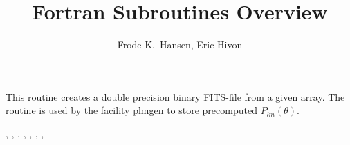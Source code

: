 
\sloppy


\title{\healpix Fortran Subroutines Overview}
 \section[write\_plm]{ }
\label{sub:write_plm}
\author{Frode K.~Hansen, Eric Hivon}

\begin{facility}
{This routine creates a double precision binary FITS-file from a given array. The routine is used by the \healpix facility plmgen to store precomputed $P_{lm}(\theta)$.}
{\modFitstools}
\end{facility}

\begin{f90format}
{%
, %
, %
, %
, %
, %
, %
, %
}
\end{f90format}

